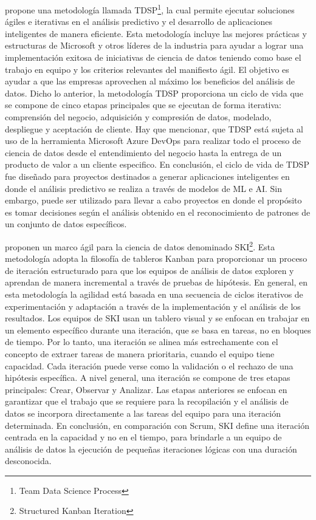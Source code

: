 \cite{Microsoft2022} propone una metodología llamada TDSP\footnote{Team Data Science Process}, la cual permite ejecutar soluciones ágiles e iterativas en el análisis predictivo y el desarrollo de aplicaciones inteligentes de manera eficiente. Esta metodología incluye las mejores prácticas y estructuras de Microsoft y otros líderes de la industria para ayudar a lograr una implementación exitosa de iniciativas de ciencia de datos teniendo como base el trabajo en equipo y los criterios relevantes del manifiesto ágil. El objetivo es ayudar a que las empresas aprovechen al máximo los beneficios del análisis de datos. Dicho lo anterior, la metodología TDSP proporciona un ciclo de vida que se compone de cinco etapas principales que se ejecutan de forma iterativa: comprensión del negocio, adquisición y compresión de datos, modelado, despliegue y aceptación de cliente. Hay que mencionar, que TDSP está sujeta al uso de la herramienta Microsoft Azure DevOps para realizar todo el proceso de ciencia de datos desde el entendimiento del negocio hasta la entrega de un producto de valor a un cliente especifico. En conclusión, el ciclo de vida de TDSP fue diseñado para proyectos destinados a generar aplicaciones inteligentes en donde el análisis predictivo se realiza a través de modelos de ML e AI. Sin embargo, puede ser utilizado para llevar a cabo proyectos en donde el propósito es tomar decisiones según el análisis obtenido en el reconocimiento de patrones de un conjunto de datos específicos.

\cite{Saltz2019} proponen un marco ágil para la ciencia de datos denominado SKI\footnote{Structured Kanban Iteration}. Esta metodología adopta la filosofía de tableros Kanban para proporcionar un proceso de iteración estructurado para que los equipos de análisis de datos exploren y aprendan de manera incremental a través de pruebas de hipótesis. En general, en esta metodología la agilidad está basada en una secuencia de ciclos iterativos de experimentación y adaptación a través de la implementación y el análisis de los resultados. Los equipos de SKI usan un tablero visual y se enfocan en trabajar en un elemento específico durante una iteración, que se basa en tareas, no en bloques de tiempo. Por lo tanto, una iteración se alinea más estrechamente con el concepto de extraer tareas de manera prioritaria, cuando el equipo tiene capacidad. Cada iteración puede verse como la validación o el rechazo de una hipótesis específica. A nivel general, una iteración se compone de tres etapas principales: Crear, Observar y Analizar. Las etapas anteriores se enfocan en garantizar que el trabajo que se requiere para la recopilación y el análisis de datos se incorpora directamente a las tareas del equipo para una iteración determinada. En conclusión, en comparación con Scrum, SKI define una iteración centrada en la capacidad y no en el tiempo, para brindarle a un equipo de análisis de datos la ejecución de pequeñas iteraciones lógicas con una duración desconocida.

